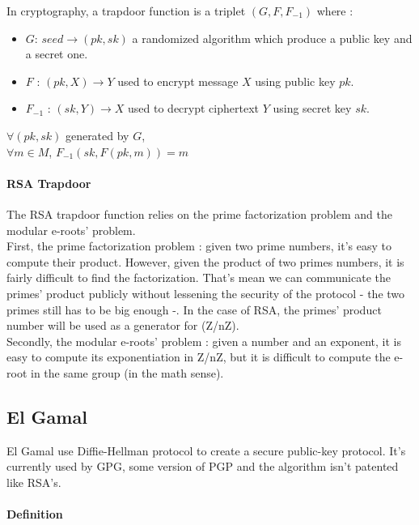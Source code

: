In cryptography, a trapdoor function is a triplet $(G, F, F_{-1})$ where :
\begin{itemize}
	\item $G$: $ seed \rightarrow (pk, sk) $ a randomized algorithm which produce a public key and a secret one.
	\item $F$ : $ (pk, X) \rightarrow  Y $ used to encrypt message $X$ using public key $pk$.
	\item $F_{-1}$ : $ (sk, Y) \rightarrow X $ used to decrypt ciphertext $Y$ using secret key $sk$.
\end{itemize}

\begin{mytheorem}
	$\forall (pk,sk) $ generated by $G$, \\
	$\forall m \in M $, $F_{-1}( sk, F(pk, m) ) = m $
\end{mytheorem}

\paragraph{RSA Trapdoor}

The RSA trapdoor function relies on the prime factorization problem and the modular e-roots' problem. \\
First, the prime factorization problem : given two prime numbers, it's easy to compute their product. However, given the product of two primes numbers, it is fairly difficult to find the factorization. That's mean we can communicate the primes' product publicly without lessening the security of the protocol - the two primes still has to be big enough -. In the case of RSA, the primes' product number will be used as a generator for (Z/nZ).\\
Secondly, the modular e-roots' problem : given a number and an exponent, it is easy to compute its exponentiation in Z/nZ, but it is difficult to compute the e-root in the same group (in the math sense).


\subsection{El Gamal}

El Gamal use Diffie-Hellman protocol to create a secure public-key protocol. It's currently used by GPG, some version of PGP and the algorithm isn't patented like RSA's. 

\paragraph{Definition \\}

